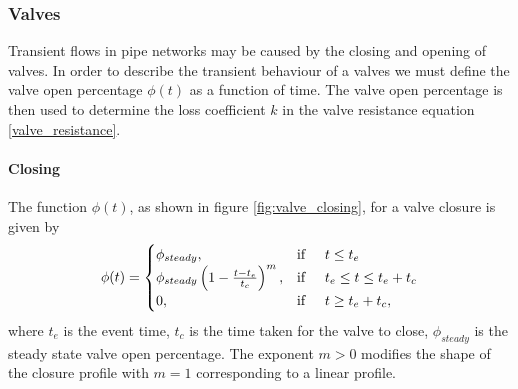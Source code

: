 \documentclass[12pt]{article}
\begin{document}
\subsubsection{Valves}

Transient flows in pipe networks may be caused by the closing and opening of valves. In order to describe the transient behaviour of a valves we must define the valve open percentage $\phi(t)$ as a function of time. The valve open percentage is then used to determine the loss coefficient $k$ in the valve resistance equation \eqref{valve_resistance}.

\paragraph{Closing}
 
 The function $\phi(t)$, as shown in figure \ref{fig:valve_closing}, for a valve closure is given by 
\begin{align}\label{valve_closure_function}
\phi(t) = 
\begin{cases} 
\phi_{steady}, &\text{if} \hspace{0.5cm} t \leq t_e \\
\phi_{steady} \left( 1 - \frac{t-t_e}{t_c} \right)^m, &\text{if} \hspace{0.5cm} t_e \leq t \leq t_e + t_c \\
0, &\text{if} \hspace{0.5cm} t \geq t_e + t_c, 
\end{cases}
\end{align} 
where $t_e$ is the event time, $t_c$ is the time taken for the valve to close, $\phi_{steady}$ is the steady state valve open percentage. The exponent $m > 0$ modifies the shape of the closure profile with $m=1$ corresponding to a linear profile. 
 
\end{document}
